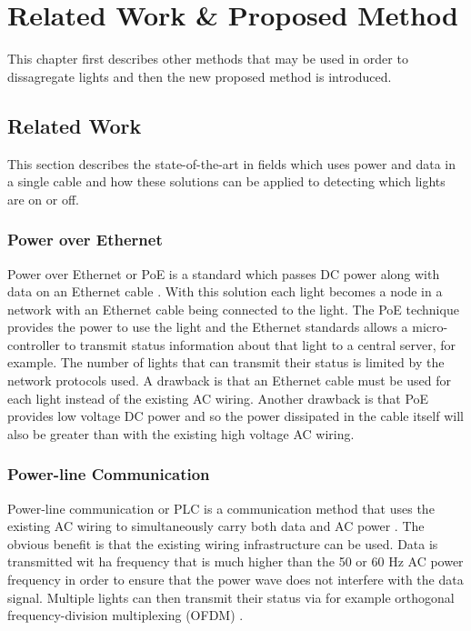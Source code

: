 
\chapter{Related Work \& Proposed Method}
\label{chp:related-work}


This chapter first describes other methods that may be used in order to dissagregate lights and then the new proposed method is introduced.


	\section{Related Work}


		This section describes the state-of-the-art in fields which uses power and data in a single cable and how these solutions can be applied to detecting which lights are on or off.





		\subsection{Power over Ethernet}

		Power over Ethernet or PoE is a standard which passes DC power along with data on an Ethernet cable \cite{patoka2003power}.
		With this solution each light becomes a node in a network with an Ethernet cable being connected to the light.
		The PoE technique provides the power to use the light and the Ethernet standards allows a micro-controller to transmit status information about that light to a central server, for example.
		The number of lights that can transmit their status is limited by the network protocols used.
		A drawback is that an Ethernet cable must be used for each light instead of the existing AC wiring.
		Another drawback is that PoE provides low voltage DC power and so the power dissipated in the cable itself will also be greater than with the existing high voltage AC wiring.





		\subsection{Power-line Communication}

		Power-line communication or PLC is a communication method that uses the existing AC wiring to simultaneously carry both data and AC power \cite{1205458}.
		The obvious benefit is that the existing wiring infrastructure can be used.
		Data is transmitted wit ha frequency that is much higher than the 50 or 60 Hz AC power frequency in order to ensure that the power wave does not interfere with the data signal.
		Multiple lights can then transmit their status via for example orthogonal frequency-division multiplexing (OFDM) \cite{hoch2011comparison}.




